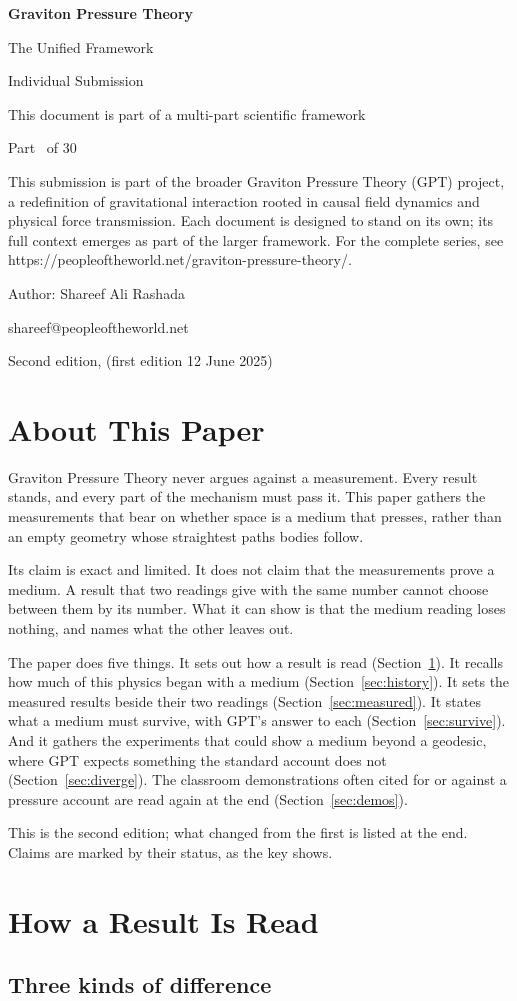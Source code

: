 \documentclass[11pt,a4paper]{article}
\makeatletter
\newcommand{\gptitle}{%
  \begin{titlepage}\centering
  \vspace*{3cm}
  {\Huge\bfseries Graviton Pressure Theory\par}\vspace{0.8cm}
  {\Large The Unified Framework\par}\vspace{0.2cm}
  {\large Individual Submission\par}\vspace{0.6cm}
  {\normalsize This document is part of a multi-part scientific framework\par}\vspace{2cm}
  {\normalsize Part \gptpart\ of 30\par}\vspace{0.8cm}
  {\huge\bfseries \gpttitle\par}\vspace{0.6cm}
  {\Large \gptsubtitle\par}\vspace{1.5cm}
  {\small\begin{minipage}{0.75\textwidth}\centering This submission is part of the broader Graviton Pressure Theory (GPT) project, a redefinition of gravitational interaction rooted in causal field dynamics and physical force transmission. Each document is designed to stand on its own; its full context emerges as part of the larger framework. For the complete series, see https://peopleoftheworld.net/graviton-pressure-theory/.\end{minipage}\par}
  \vfill
  {\large Author: Shareef Ali Rashada\par}\vspace{0.2cm}
  {\normalsize shareef@peopleoftheworld.net\par}\vspace{0.5cm}
  {\normalsize Second edition, \gptdate \quad (first edition 12 June 2025)\par}
  \end{titlepage}
  \setcounter{page}{1}\tableofcontents\clearpage}
\makeatother
\begin{document}
\gptitle

\section*{About This Paper}

Graviton Pressure Theory never argues against a measurement. Every result stands, and every part of the mechanism must pass it. This paper gathers the measurements that bear on whether space is a medium that presses, rather than an empty geometry whose straightest paths bodies follow.

Its claim is exact and limited.  It does not claim that the measurements prove a medium. A result that two readings give with the same number cannot choose between them by its number. What it can show is that the medium reading loses nothing, and names what the other leaves out.

The paper does five things. It sets out how a result is read (Section~\ref{sec:reading}). It recalls how much of this physics began with a medium (Section~\ref{sec:history}). It sets the measured results beside their two readings (Section~\ref{sec:measured}). It states what a medium must survive, with GPT's answer to each (Section~\ref{sec:survive}). And it gathers the experiments that could show a medium beyond a geodesic, where GPT expects something the standard account does not (Section~\ref{sec:diverge}). The classroom demonstrations often cited for or against a pressure account are read again at the end (Section~\ref{sec:demos}).

This is the second edition; what changed from the first is listed at the end. Claims are marked by their status, as the key shows.

\statuskey

\section{How a Result Is Read}\label{sec:reading}

\subsection{Three kinds of difference}
\end{document}
